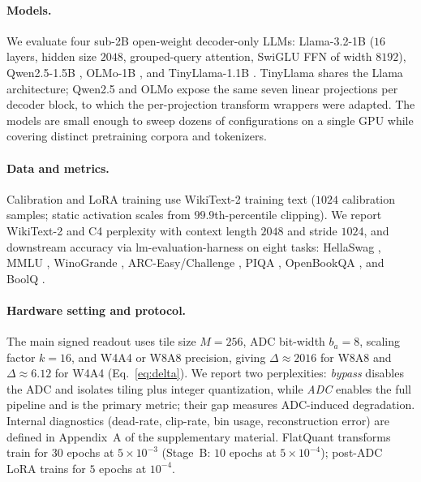 \documentclass[letterpaper]{article} %
\theoremstyle{plain}
\begin{document}
\paragraph{Models.}
We evaluate four sub-2B open-weight decoder-only LLMs: Llama-3.2-1B \citep{dubey2024llama} ($16$ layers, hidden size $2048$, grouped-query attention, SwiGLU FFN of width $8192$), Qwen2.5-1.5B \citep{qwen2025qwen25}, OLMo-1B \citep{groeneveld2024olmo}, and TinyLlama-1.1B \citep{zhang2024tinyllama}. TinyLlama shares the Llama architecture; Qwen2.5 and OLMo expose the same seven linear projections per decoder block, to which the per-projection transform wrappers were adapted. The models are small enough to sweep dozens of configurations on a single GPU while covering distinct pretraining corpora and tokenizers.

\paragraph{Data and metrics.}
Calibration and LoRA training use WikiText-2 training text \citep{merity2017pointer} ($1024$ calibration samples; static activation scales from $99.9$th-percentile clipping). We report WikiText-2 and C4 \citep{raffel2020exploring} perplexity with context length $2048$ and stride $1024$, and downstream accuracy via lm-evaluation-harness \citep{gao2024lmeval} on eight tasks: HellaSwag \citep{zellers2019hellaswag}, MMLU \citep{hendrycks2021mmlu}, WinoGrande \citep{sakaguchi2021winogrande}, ARC-Easy/Challenge \citep{clark2018arc}, PIQA \citep{bisk2020piqa}, OpenBookQA \citep{mihaylov2018openbookqa}, and BoolQ \citep{clark2019boolq}.

\paragraph{Hardware setting and protocol.}
The main signed readout uses tile size $M = 256$, ADC bit-width $b_a = 8$, scaling factor $k = 16$, and W4A4 or W8A8 precision, giving $\Delta \approx 2016$ for W8A8 and $\Delta \approx 6.12$ for W4A4 (Eq.~\ref{eq:delta}). We report two perplexities: \emph{bypass} disables the ADC and isolates tiling plus integer quantization, while \emph{ADC} enables the full pipeline and is the primary metric; their gap measures ADC-induced degradation. Internal diagnostics (dead-rate, clip-rate, bin usage, reconstruction error) are defined in Appendix~A of the supplementary material. FlatQuant transforms train for $30$ epochs at $5\times10^{-3}$ (Stage~B: $10$ epochs at $5\times10^{-4}$); post-ADC LoRA trains for $5$ epochs at $10^{-4}$.
\end{document}

